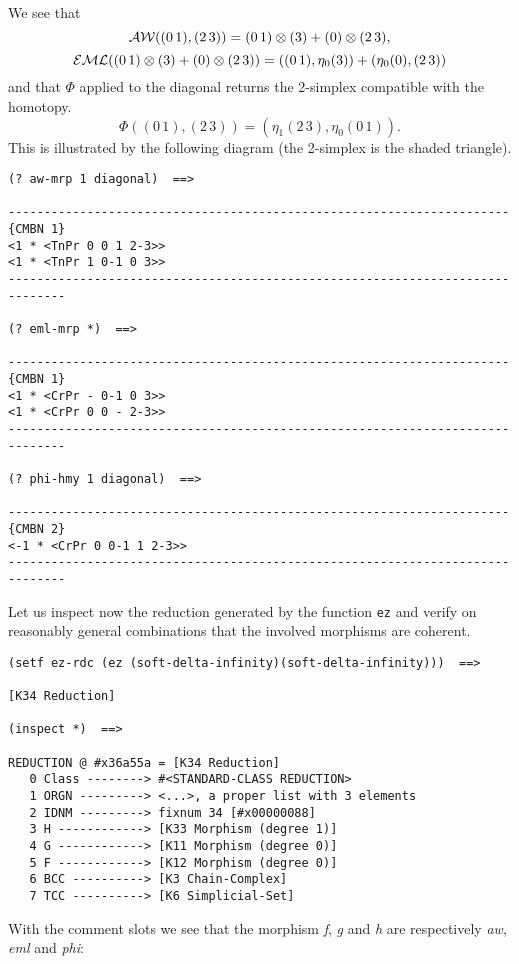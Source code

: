 We see that 
$$ {\cal AW}((0\, 1), (2\, 3)) = (0\, 1)\otimes (3) + (0) \otimes (2\, 3),$$
$$ {\cal EML}((0\, 1)\otimes (3) + (0) \otimes (2\, 3))= ((0\, 1), \eta_0 (3)) 
     + (\eta_0 (0), (2\, 3))$$
and that $\Phi$ applied to the diagonal returns the 2-simplex compatible
with the homotopy. 
$$\Phi((0\, 1), (2\, 3))= (\eta_1(2\, 3),\eta_0(0\, 1)).$$
This is illustrated by the following diagram (the 2-simplex is the shaded triangle).
\vskip 0.50cm
%
\centerline{}
%
\vskip 0.50cm
{\footnotesize\begin{verbatim}
(? aw-mrp 1 diagonal)  ==>

----------------------------------------------------------------------{CMBN 1}
<1 * <TnPr 0 0 1 2-3>>
<1 * <TnPr 1 0-1 0 3>>
------------------------------------------------------------------------------

(? eml-mrp *)  ==>

----------------------------------------------------------------------{CMBN 1}
<1 * <CrPr - 0-1 0 3>>
<1 * <CrPr 0 0 - 2-3>>
------------------------------------------------------------------------------

(? phi-hmy 1 diagonal)  ==>

----------------------------------------------------------------------{CMBN 2}
<-1 * <CrPr 0 0-1 1 2-3>>
------------------------------------------------------------------------------
\end{verbatim}}
Let us inspect now the reduction generated by the function {\tt ez} and 
verify on reasonably general combinations that the involved morphisms  are coherent.
{\footnotesize\begin{verbatim}
(setf ez-rdc (ez (soft-delta-infinity)(soft-delta-infinity)))  ==>

[K34 Reduction]

(inspect *)  ==>

REDUCTION @ #x36a55a = [K34 Reduction]
   0 Class --------> #<STANDARD-CLASS REDUCTION>
   1 ORGN ---------> <...>, a proper list with 3 elements
   2 IDNM ---------> fixnum 34 [#x00000088]
   3 H ------------> [K33 Morphism (degree 1)]
   4 G ------------> [K11 Morphism (degree 0)]
   5 F ------------> [K12 Morphism (degree 0)]
   6 BCC ----------> [K3 Chain-Complex]
   7 TCC ----------> [K6 Simplicial-Set]
\end{verbatim}}
With the comment slots we see that the morphism {\em f}, {\em g} and {\em h}
are respectively {\em aw}, {\em eml} and {\em phi}:
